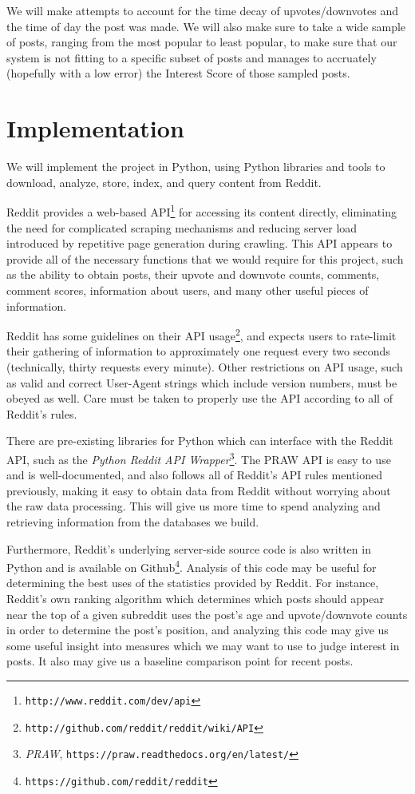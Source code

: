 \documentclass{acm_proc_article-sp}
\begin{document}
We will make attempts to account for the time decay of upvotes/downvotes and the time of day the post was made. We will
also make sure to take a wide sample of posts, ranging from the most popular to least popular, to make sure that our system
is not fitting to a specific subset of posts and manages to accruately (hopefully with a low error) the Interest Score of 
those sampled posts.


\section{Implementation}
We will implement the project in Python, using Python libraries and tools to download, analyze,
store, index, and query content from Reddit.

Reddit provides a web-based API\footnote{\texttt{http://www.reddit.com/dev/api}} for accessing its
content directly, eliminating the need for complicated scraping mechanisms and reducing server
load introduced by repetitive page generation during crawling.  This API appears to provide all
of the necessary functions that we would require for this project, such as the ability to
obtain posts, their upvote and downvote counts, comments, comment scores, information about
users, and many other useful pieces of information.

Reddit has some guidelines on their API usage\footnote{\texttt{http://github.com/reddit/reddit/wiki/API}},
and expects users to rate-limit their gathering of information to approximately one request every two seconds
(technically, thirty requests every minute).  Other restrictions on API usage, such as valid
and correct User-Agent strings which include version numbers, must be obeyed as well.
Care must be taken to properly use the API according to all of Reddit's rules.

There are pre-existing libraries for Python which can interface with the Reddit API, such as
the \textit{Python Reddit API Wrapper}\footnote{\textit{PRAW}, \texttt{https://praw.readthedocs.org/en/latest/}}.
The PRAW API is easy to use and is well-documented, and also follows all of Reddit's API rules
mentioned previously, making it easy to obtain data from Reddit without worrying about the raw
data processing.  This will give us more time to spend analyzing and retrieving information
from the databases we build.

Furthermore, Reddit's underlying server-side source code is also written
in Python and is available on Github\footnote{\texttt{https://github.com/reddit/reddit}}.  Analysis of this
code may be useful for determining the best uses of the statistics provided by Reddit.  For instance,
Reddit's own ranking algorithm which determines which posts should appear near the top of a given
subreddit uses the post's age and upvote/downvote counts in order to determine the post's position,
and analyzing this code may give us some useful insight into measures which we may want to use to
judge interest in posts.  It also may give us a baseline comparison point for recent posts.
\end{document}
